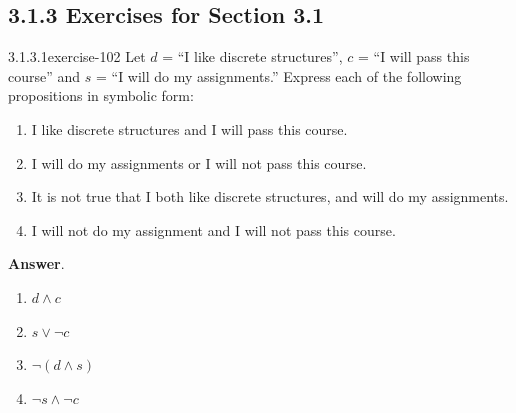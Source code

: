 \documentclass[twoside,10pt,]{book}
\numberwithin{equation}{section}
\begin{document}
\subsection*{3.1.3 Exercises for Section 3.1}
\begin{divisionsolution}{3.1.3.1}{}{exercise-102}%
\hypertarget{p-904}{}%
Let \(d\) = ``I like discrete structures'', \(c\) = ``I will pass this course'' and \(s\) = ``I will do my assignments.''  Express each of the following propositions in symbolic form:%
\par
\hypertarget{p-905}{}%
\leavevmode%
\begin{enumerate}[label=(\alph*)]
\item\hypertarget{li-493}{}\hypertarget{p-906}{}%
I like discrete structures and I will pass this course.%
\item\hypertarget{li-494}{}\hypertarget{p-907}{}%
I will do my assignments or I will not pass this course.%
\item\hypertarget{li-495}{}\hypertarget{p-908}{}%
It is not true that I both like discrete structures, and will do my assignments.%
\item\hypertarget{li-496}{}\hypertarget{p-909}{}%
I will not do my assignment and I will not pass this course.%
\end{enumerate}
%
\par\smallskip%
\noindent\textbf{Answer}.\quad%
\hypertarget{p-910}{}%
\leavevmode%
\begin{multicols}{2}
\begin{enumerate}[label=(\alph*)]
\item\hypertarget{li-497}{}\(d\land c\)%
\item\hypertarget{li-498}{}\(s\lor \neg c\)%
\item\hypertarget{li-499}{}\(\neg (d\land s)\)%
\item\hypertarget{li-500}{}\(\neg s\land \neg c\)%
\end{enumerate}
\end{multicols}
%
\end{divisionsolution}%
\end{document}
